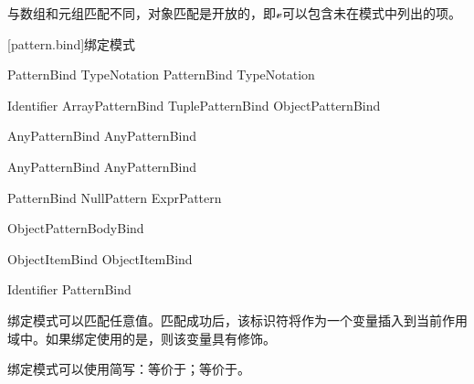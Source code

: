 \pnum
与数组和元组匹配不同，对象匹配是开放的，即$\mathcal{v}$可以包含未在模式中列出的项。

[pattern.bind]{绑定模式}

\begin{bnf}
 \br
     PatternBind TypeNotation\bnfq \br
     PatternBind TypeNotation\bnfq
\end{bnf}

\begin{bnf}
 \br
    Identifier \br
    ArrayPatternBind \br
    TuplePatternBind \br
    ObjectPatternBind \br
\end{bnf}

\begin{bnf}
 \br
    \terminal{[} AnyPatternBind \bnflp\terminal{,} AnyPatternBind\bnfrp\bnfs \terminal{]}
\end{bnf}

\begin{bnf}
 \br
    \terminal{(} AnyPatternBind \bnflp\terminal{,} AnyPatternBind\bnfrp\bnfs \terminal{)}
\end{bnf}

\begin{bnf}
 \br
    PatternBind \br
     \br
    NullPattern \br
    ExprPattern
\end{bnf}

\begin{bnf}
     \br
        \terminal{\{} ObjectPatternBodyBind \terminal{\}}
    \end{bnf}

    \begin{bnf}
     \br
        ObjectItemBind \bnflp\terminal{,} ObjectItemBind\bnfrp\bnfs
    \end{bnf}

    \begin{bnf}
     \br
        Identifier \terminal{:} PatternBind
    \end{bnf}

\pnum
绑定模式可以匹配任意值。匹配成功后，该标识符将作为一个变量插入到当前作用域中。如果绑定使用的是，则该变量具有修饰。

\pnum
绑定模式可以使用简写：等价于；等价于\tcode{[let i, _]}。

